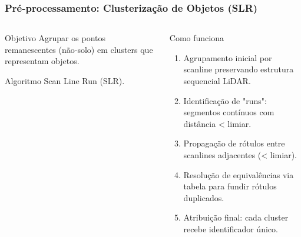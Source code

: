 \documentclass[aspectratio=169,t,xcolor=table]{beamer}
\begin{document}
\begin{frame}
    \frametitle{Pré-processamento: Clusterização de Objetos (SLR)}
    \begin{columns}[T]
        \begin{column}{.4\textwidth}
            \begin{block}{Objetivo}
                \vspace{1.5em}
                Agrupar os pontos remanescentes (não-solo) em clusters que representam objetos.
                \vspace{1.5em}
            \end{block}
            \begin{block}{Algoritmo}
                \vspace{1.5em}
                Scan Line Run (SLR).
                \vspace{1.5em}
            \end{block}
        \end{column}
        \begin{column}{.6\textwidth}
            \begin{block}{Como funciona}
                \begin{enumerate}[<+->]
                    \item Agrupamento inicial por scanline preservando estrutura sequencial LiDAR.
                    \item Identificação de "runs": segmentos contínuos com distância < limiar.
                    \item Propagação de rótulos entre scanlines adjacentes (< limiar).
                    \item Resolução de equivalências via tabela para fundir rótulos duplicados.
                    \item Atribuição final: cada cluster recebe identificador único.
                \end{enumerate}
            \end{block}
        \end{column}
    \end{columns}
\end{frame}
\end{document}
